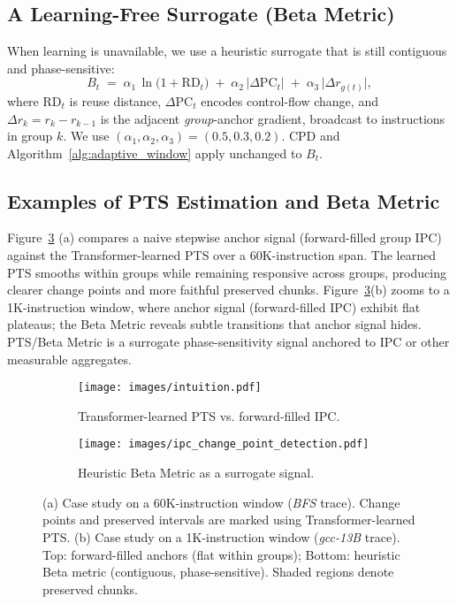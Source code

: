 \subsection{A Learning-Free Surrogate (Beta Metric)}
\label{subsec:beta}
When learning is unavailable, we use a heuristic surrogate that is still contiguous and phase-sensitive:
\begin{equation}
\label{eq:beta}
B_t \;=\; \alpha_1\,\ln\big(1+\mathrm{RD}_t\big)\;+\;\alpha_2\,\big|\Delta\mathrm{PC}_t\big|\;+\;\alpha_3\,\big|\Delta r_{g(t)}\big|,
\end{equation}
where \(\mathrm{RD}_t\) is reuse distance, \(\Delta\mathrm{PC}_t\) encodes control-flow change, and \(\Delta r_k=r_k-r_{k-1}\) is the adjacent \emph{group}-anchor gradient, broadcast to instructions in group \(k\). We use \((\alpha_1,\alpha_2,\alpha_3)=(0.5,0.3,0.2)\). CPD and Algorithm~\ref{alg:adaptive_window} apply unchanged to \(B_t\).


\subsection{Examples of PTS Estimation and Beta Metric}
\label{sec3.2}
Figure~\ref{fig:2} (a) compares a naive stepwise anchor signal (forward-filled group IPC) against the Transformer-learned PTS over a 60K-instruction span. The learned PTS smooths within groups while remaining responsive across groups, producing clearer change points and more faithful preserved chunks. Figure~\ref{fig:2}(b) zooms to a 1K-instruction window, where anchor signal (forward-filled IPC) exhibit flat plateaus; the Beta Metric reveals subtle transitions that anchor signal hides. PTS/Beta Metric is a surrogate phase-sensitivity signal anchored to IPC or other measurable aggregates.
\begin{figure}[!htbp]
    \centering
    \captionsetup{skip=3pt}
    \captionsetup[subfigure]{font=footnotesize, skip=1pt}
    \begin{subfigure}[b]{0.99\columnwidth}
        \centering
        \texttt{[image: images/intuition.pdf]}
        \caption{Transformer-learned PTS vs. forward-filled IPC.}
        \label{fig:ipc_imputation}
    \end{subfigure}
    \begin{subfigure}[b]{0.99\columnwidth}
        \centering
        \texttt{[image: images/ipc\_change\_point\_detection.pdf]}
        \caption{Heuristic Beta Metric as a surrogate signal.}
        \label{fig:beta_approach}
    \end{subfigure}
    \caption{(a) Case study on a 60K-instruction window (\emph{BFS} trace). Change points and preserved intervals are marked using Transformer-learned PTS. (b) Case study on a 1K-instruction window (\emph{gcc-13B} trace). Top: forward-filled anchors (flat within groups); Bottom: heuristic Beta metric (contiguous, phase-sensitive). Shaded regions denote preserved chunks.}
    \label{fig:2}
\end{figure} 
